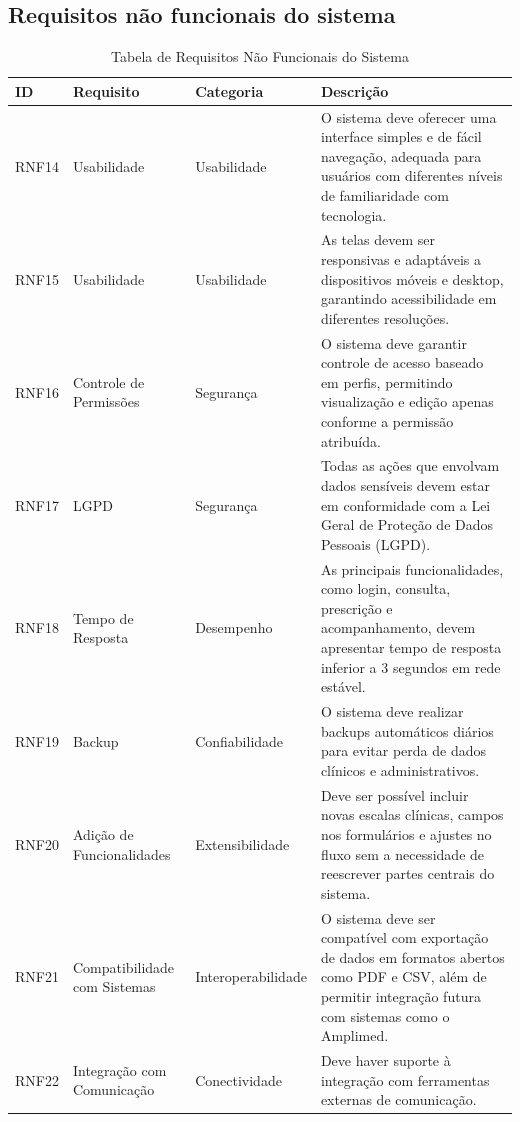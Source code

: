 \href{}{}\documentclass[12pt,portuguese,oneside]{article}
\begin{document}
\subsection{Requisitos não funcionais do sistema}
\begin{table}[H]
\centering
\caption{Tabela de Requisitos Não Funcionais do Sistema}
\begin{tabularx}{\textwidth}{|>{\raggedright\arraybackslash}p{1.5cm}|>{\raggedright\arraybackslash}p{3cm}|>{\raggedright\arraybackslash}p{3cm}|>{\raggedright\arraybackslash}X|}
\hline
\rowcolor{gray!20}
\textbf{ID} & \textbf{Requisito} & \textbf{Categoria} & \textbf{Descrição}\\
\hline
RNF14 & Usabilidade & Usabilidade & O sistema deve oferecer uma interface simples e de fácil navegação, adequada para usuários com diferentes níveis de familiaridade com tecnologia.\\
\hline
RNF15 & Usabilidade & Usabilidade & As telas devem ser responsivas e adaptáveis a dispositivos móveis e desktop, garantindo acessibilidade em diferentes resoluções.\\
\hline
RNF16 & Controle de Permissões & Segurança & O sistema deve garantir controle de acesso baseado em perfis, permitindo visualização e edição apenas conforme a permissão atribuída.\\
\hline
RNF17 & LGPD & Segurança & Todas as ações que envolvam dados sensíveis devem estar em conformidade com a Lei Geral de Proteção de Dados Pessoais (LGPD).\\
\hline
RNF18 & Tempo de Resposta & Desempenho & As principais funcionalidades, como login, consulta, prescrição e acompanhamento, devem apresentar tempo de resposta inferior a 3 segundos em rede estável.\\
\hline
RNF19 & Backup & Confiabilidade & O sistema deve realizar backups automáticos diários para evitar perda de dados clínicos e administrativos.\\
\hline
RNF20 & Adição de Funcionalidades & Extensibilidade & Deve ser possível incluir novas escalas clínicas, campos nos formulários e ajustes no fluxo sem a necessidade de reescrever partes centrais do sistema.\\
\hline
RNF21 & Compatibilidade com Sistemas & Interoperabilidade & O sistema deve ser compatível com exportação de dados em formatos abertos como PDF e CSV, além de permitir integração futura com sistemas como o Amplimed.\\
\hline
RNF22 & Integração com Comunicação & Conectividade & Deve haver suporte à integração com ferramentas externas de comunicação.\\
\hline
\end{tabularx}
\end{table}
\end{document}
